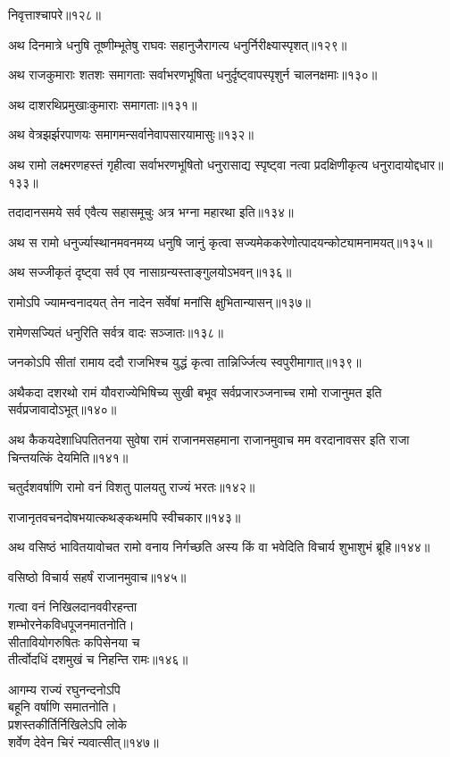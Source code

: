 \begin{flushleft}
निवृत्ताश्चापरे॥१२८॥

अथ दिनमात्रे धनुषि तूष्णीम्भूतेषु राघवः सहानुजैरागत्य धनुर्निरीक्ष्यास्पृशत्॥१२९॥

अथ राजकुमाराः शतशः समागताः सर्वाभरणभूषिता धनुर्दृष्ट्वापस्पृशुर्न चालनक्षमाः॥१३०॥

अथ दाशरथिप्रमुखाःकुमाराः समागताः॥१३१॥

अथ वेत्रझर्झरपाणयः समागमन्सर्वानेवापसारयामासुः॥१३२॥

अथ रामो लक्ष्मरणहस्तं गृहीत्वा सर्वाभरणभूषितो धनुरासाद्य स्पृष्ट्वा नत्वा प्रदक्षिणीकृत्य धनुरादायोद्दधार॥१३३॥

तदादानसमये सर्व एवैत्य सहासमूचुः अत्र भग्ना महारथा इति॥१३४॥

अथ स रामो धनुर्ज्यास्थानमवनमय्य धनुषि जानुं कृत्वा सज्यमेककरेणोत्पादयन्कोट्यामनामयत्॥१३५॥

अथ सज्जीकृतं दृष्ट्वा सर्व एव नासाग्रन्यस्ताङ्गुलयोऽभवन्॥१३६॥

रामोऽपि ज्यामन्वनादयत् तेन नादेन सर्वेषां मनांसि क्षुभितान्यासन्॥१३७॥

रामेणसज्यितं धनुरिति सर्वत्र वादः सञ्जातः॥१३८॥

जनकोऽपि सीतां रामाय ददौ राजभिश्च युद्धं कृत्वा तान्निर्ज्जित्य स्वपुरीमागात्॥१३९॥

अथैकदा दशरथो रामं यौवराज्येभिषिच्य सुखी बभूव सर्वप्रजारञ्जनाच्च रामो राजानुमत इति सर्वप्रजावादोऽभूत्॥१४०॥

अथ कैकयदेशाधिपतितनया सुवेषा रामं राजानमसहमाना राजानमुवाच मम वरदानावसर इति राजा चिन्तयत्किं देयमिति॥१४१॥


चतुर्दशवर्षाणि रामो वनं विशतु पालयतु राज्यं भरतः॥१४२॥

राजानृतवचनदोषभयात्कथङ्कथमपि स्वीचकार॥१४३॥

अथ वसिष्ठं भावितयावोचत रामो वनाय निर्गच्छति अस्य किं वा भवेदिति विचार्य शुभाशुभं ब्रूहि॥१४४॥

वसिष्ठो विचार्य सहर्षं राजानमुवाच॥१४५॥

गत्वा वनं निखिलदानववीरहन्ता\\
शम्भोरनेकविधपूजनमातनोति।\\
सीतावियोगरुषितः कपिसेनया च\\
तीर्त्वोदधिं दशमुखं च निहन्ति रामः॥१४६॥

आगम्य राज्यं रघुनन्दनोऽपि\\
बहूनि वर्षाणि समातनोति।\\
प्रशस्तकीर्तिर्निखिलेऽपि लोके\\
शर्वेण देवेन चिरं न्यवात्सीत्॥१४७॥


\end{flushleft}
